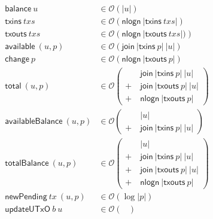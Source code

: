 \documentclass{article}
\newcommand{\order}[1]{\mathcal{O}\left(#1\right)}
\theoremstyle{definition}{
  \newtheorem{lemma}{Lemma}[section] %
  \newtheorem{definition}[lemma]{Definition}
}
\theoremstyle{theorem}{
  \newtheorem{invariant}[lemma]{Invariant}
  \newtheorem{proofobligation}[lemma]{Proof Obligation}
}
\numberwithin{equation}{lemma}
\begin{document}
\begin{figure}
\begin{equation*}
\begin{split}
\mathsf{balance} ~ u & \in \order{|u|} \\
\mathsf{txins}   ~ \mathit{txs}  & \in \order{\mathsf{nlogn} ~ |\mathsf{txins}~ \mathit{txs}|} \\
\mathsf{txouts}  ~ \mathit{txs}  & \in \order{\mathsf{nlogn} ~ |\mathsf{txouts}~ \mathit{txs}|)} \\
\mathsf{available} ~ (u,p) & \in \order{\mathsf{join} ~ |\mathsf{txins}~ p| ~ |u|} \\
\mathsf{change}    ~ p     & \in \order{\mathsf{nlogn} ~ |\mathsf{txouts}~ p| } \\
\mathsf{total}     ~ (u,p) & \in \order{
                              \begin{split}
                                & ~ \mathsf{join} ~ |\mathsf{txins}~ p| ~ |u| \\
                              + & ~ \mathsf{join} ~ |\mathsf{txouts}~ p| ~ |u| \\
                              + & ~ \mathsf{nlogn} ~ |\mathsf{txouts}~ p|
                              \end{split}} \\
\mathsf{availableBalance} ~ (u,p) & \in \order{
                              \begin{split}
                                & ~ |u| \\
                              + & ~ \mathsf{join} ~ |\mathsf{txins}~ p| ~ |u|
                              \end{split}} \\
\mathsf{totalBalance}     ~ (u,p) & \in \order{
                              \begin{split}
                                & ~ |u| \\
                              + & ~ \mathsf{join} ~ |\mathsf{txins}~ p| ~ |u| \\
                              + & ~ \mathsf{join} ~ |\mathsf{txouts}~ p| ~ |u| \\
                              + & ~ \mathsf{nlogn} ~ |\mathsf{txouts}~ p|
                              \end{split}} \\
\mathsf{newPending} ~ tx ~ (u,p) & \in \order{\log |p|} \\
\mathsf{updateUTxO} ~ b ~ u & \in \order{
                              \begin{split}

\end{split}}
\end{split}
\end{equation*}
\end{figure}
\end{document}

